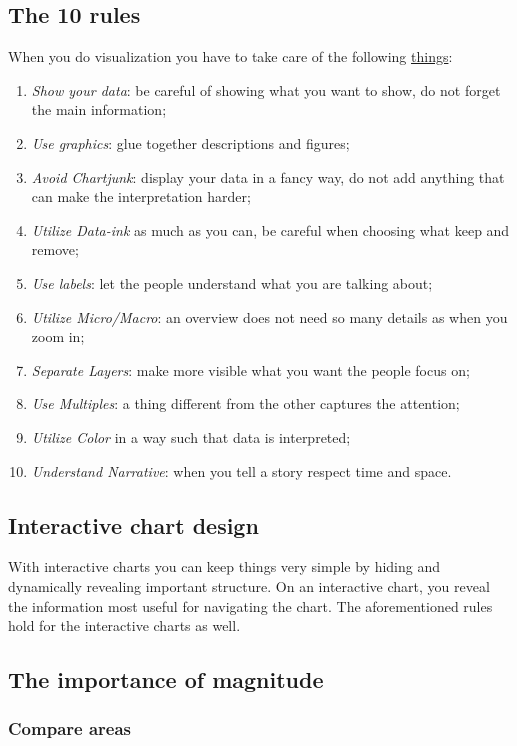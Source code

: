 \subsection*{The 10 rules}

When you do visualization you have to take care of the following \href{http://www.sealthreinhold.com/school/tuftes-rules/}{things}:

\begin{enumerate}
\item \emph{Show your data}: be careful of showing what you want to show, do not forget the main information;
\item \emph{Use graphics}: glue together descriptions and figures;
\item \emph{Avoid Chartjunk}: display your data in a fancy way, do not add anything that can make the interpretation harder;
\item \emph{Utilize Data-ink} as much as you can, be careful when choosing what keep and remove;
\item \emph{Use labels}: let the people understand what you are talking about;
\item \emph{Utilize Micro/Macro}: an overview does not need so many details as when you zoom in;
\item \emph{Separate Layers}: make more visible what you want the people focus on;
\item \emph{Use Multiples}: a thing different from the other captures the attention;
\item \emph{Utilize Color} in a way such that data is interpreted;
\item \emph{Understand Narrative}: when you tell a story respect time and space.
\end{enumerate}

\subsection*{Interactive chart design}

With interactive charts you can keep things very simple by hiding and dynamically revealing important structure.
On an interactive chart, you reveal the information most useful for navigating the chart. The aforementioned rules hold for the interactive charts as well.

\subsection*{The importance of magnitude}
\subsubsection*{Compare areas}

